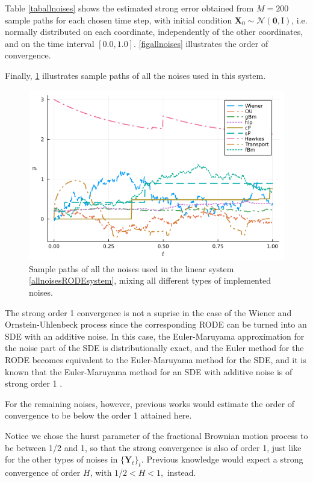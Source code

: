 \documentclass[reqno,12pt]{amsart}
\theoremstyle{plain} %
\theoremstyle{definition} %
\begin{document}
Table \ref{taballnoises} shows the estimated strong error obtained from $M=200$ sample paths for each chosen time step, with initial condition $\mathbf{X}_0 \sim \mathcal{N}(\mathbf{0}, \mathrm{I})$, i.e. normally distributed on each coordinate, independently of the other coordinates, and on the time interval $[0.0, 1.0]$. \cref{figallnoises} illustrates the order of convergence.

Finally, \cref{figsamplepathsallnoises} illustrates sample paths of all the noises used in this system.

\begin{figure}[htb]
    \includegraphics[scale=0.6]{img/noisepath_allnoises.png}
    \caption{Sample paths of all the noises used in the linear system \eqref{allnoisesRODEsystem}, mixing all different types of implemented noises.}
    \label{figsamplepathsallnoises}
\end{figure}

The strong order 1 convergence is not a suprise in the case of the Wiener and Ornstein-Uhlenbeck process since the corresponding RODE can be turned into an SDE with an additive noise. In this case, the Euler-Maruyama approximation for the noise part of the SDE is distributionally exact, and the Euler method for the RODE becomes equivalent to the Euler-Maruyama method for the SDE, and it is known that the Euler-Maruyama method for an SDE with additive noise is of strong order 1 \cite{HighamKloeden2021}.

For the remaining noises, however, previous works would estimate the order of convergence to be below the order 1 attained here.

Notice we chose the hurst parameter of the fractional Brownian motion process to be between 1/2 and 1, so that the strong convergence is also of order 1, just like for the other types of noises in $\{\mathbf{Y}_t\}_t$. Previous knowledge would expect a strong convergence of order $H$, with $1/2 < H < 1,$ instead.
\end{document}
